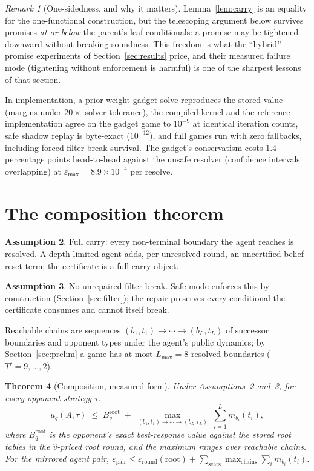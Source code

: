 \documentclass[11pt]{article}
\theoremstyle{plain}
\newtheorem{theorem}{Theorem}[section]
\theoremstyle{definition}
\newtheorem{assumption}[theorem]{Assumption}
\theoremstyle{remark}
\newtheorem{remark}[theorem]{Remark}
\newcommand{\pathmax}[1]{\max_{#1}}
\begin{document}
\begin{remark}[One-sidedness, and why it matters]\label{rem:oneside}
Lemma~\ref{lem:carry} is an equality for the one-functional
construction, but the telescoping argument below survives promises
\emph{at or below} the parent's leaf conditionals: a promise may be
tightened downward without breaking soundness. This freedom is what
the ``hybrid'' promise experiments of Section~\ref{sec:results}
price, and their measured failure mode (tightening without enforcement
is harmful) is one of the sharpest lessons of that section.
\end{remark}

In implementation, a prior-weight gadget solve reproduces the stored
value (margins under $20\times$ solver tolerance), the compiled kernel
and the reference implementation agree on the gadget game to $10^{-9}$
at identical iteration counts, safe shadow replay is byte-exact
($10^{-12}$), and full games run with zero fallbacks, including forced
filter-break survival. The gadget's conservatism costs $1.4$
percentage points head-to-head against the unsafe resolver
(confidence intervals overlapping) at
$\varepsilon_{\max}=8.9\times10^{-4}$ per resolve.

\section{The composition theorem}\label{sec:theorem}

\begin{assumption}\label{ass:full}
Full carry: every non-terminal boundary the agent reaches is resolved.
A depth-limited agent adds, per unresolved round, an uncertified
belief-reset term; the certificate is a full-carry object.
\end{assumption}

\begin{assumption}\label{ass:break}
No unrepaired filter break. Safe mode enforces this by construction
(Section~\ref{sec:filter}); the repair preserves every conditional the
certificate consumes and cannot itself break.
\end{assumption}

Reachable chains are sequences $(b_1,t_1)\to\cdots\to(b_L,t_L)$ of
successor boundaries and opponent types under the agent's public
dynamics; by Section~\ref{sec:prelim} a game has at most
$L_{\max}=8$ resolved boundaries ($T'=9,\dots,2$).

\begin{theorem}[Composition, measured form]\label{thm:comp}
Under Assumptions~\ref{ass:full} and~\ref{ass:break}, for every
opponent strategy $\tau$:
\[
u_q(A,\tau) \;\le\; B^{\mathrm{root}}_q \;+\;
\pathmax{(b_1,t_1)\to\cdots\to(b_L,t_L)}\;\sum_{i=1}^{L} m_{b_i}(t_i),
\]
where $B^{\mathrm{root}}_q$ is the opponent's exact best-response value
against the stored root tables in the $\hat v$-priced root round, and
the maximum ranges over reachable chains. For the mirrored agent pair,
$\varepsilon_{\mathrm{pair}} \le
\varepsilon_{\mathrm{round}}(\mathrm{root}) +
\sum_{\mathrm{seats}}\pathmax{\mathrm{chains}}\sum_i m_{b_i}(t_i)$.
\end{theorem}
\end{document}
